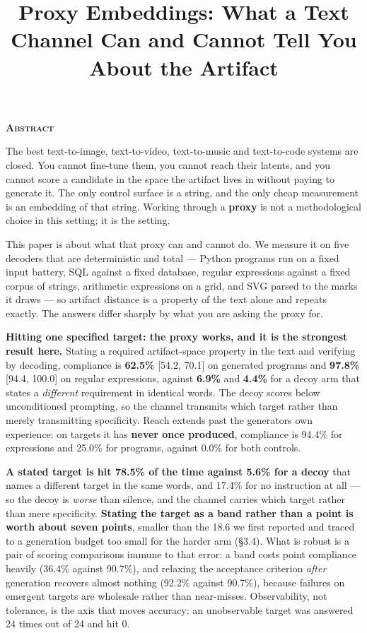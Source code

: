 \documentclass[
  10pt,
]{article}
\title{Proxy Embeddings: What a Text Channel Can and Cannot Tell You
About the Artifact}
\author{}
\date{}
\theoremstyle{plain}
\theoremstyle{definition}
\newenvironment{iclrabstract}
  {\vspace{0.4em}\begin{center}{\bfseries\scshape Abstract}\end{center}
   \begin{list}{}{\setlength{\leftmargin}{0.45in}\setlength{\rightmargin}{0.45in}}\item[]\relax}
  {\end{list}\vspace{0.6em}}
\begin{document}
\maketitle

\begin{iclrabstract}

The best text-to-image, text-to-video, text-to-music and text-to-code
systems are closed. You cannot fine-tune them, you cannot reach their
latents, and you cannot score a candidate in the space the artifact
lives in without paying to generate it. The only control surface is a
string, and the only cheap measurement is an embedding of that string.
Working through a \textbf{proxy} is not a methodological choice in this
setting; it is the setting.

This paper is about what that proxy can and cannot do. We measure it on
five decoders that are deterministic and total --- Python programs run
on a fixed input battery, SQL against a fixed database, regular
expressions against a fixed corpus of strings, arithmetic expressions on
a grid, and SVG parsed to the marks it draws --- so artifact distance is
a property of the text alone and repeats exactly. The answers differ
sharply by what you are asking the proxy for.

\textbf{Hitting one specified target: the proxy works, and it is the
strongest result here.} Stating a required artifact-space property in
the text and verifying by decoding, compliance is \textbf{62.5\%}
{[}54.2, 70.1{]} on generated programs and \textbf{97.8\%} {[}94.4,
100.0{]} on regular expressions, against \textbf{6.9\%} and
\textbf{4.4\%} for a decoy arm that states a \emph{different}
requirement in identical words. The decoy scores below unconditioned
prompting, so the channel transmits which target rather than merely
transmitting specificity. Reach extends past the
generator\textquotesingle s own experience: on targets it has
\textbf{never once produced}, compliance is 94.4\% for expressions and
25.0\% for programs, against 0.0\% for both controls.

\textbf{A stated target is hit 78.5\% of the time against 5.6\% for a
decoy} that names a different target in the same words, and 17.4\% for
no instruction at all --- so the decoy is \emph{worse} than silence, and
the channel carries which target rather than mere specificity.
\textbf{Stating the target as a band rather than a point is worth about
seven points}, smaller than the 18.6 we first reported and traced to a
generation budget too small for the harder arm (§3.4). What is robust is
a pair of scoring comparisons immune to that error: a band costs point
compliance heavily (36.4\% against 90.7\%), and relaxing the acceptance
criterion \emph{after} generation recovers almost nothing (92.2\%
against 90.7\%), because failures on emergent targets are wholesale
rather than near-misses. Observability, not tolerance, is the axis that
moves accuracy: an unobservable target was answered 24 times out of 24
and hit 0.


\end{iclrabstract}
\end{document}
